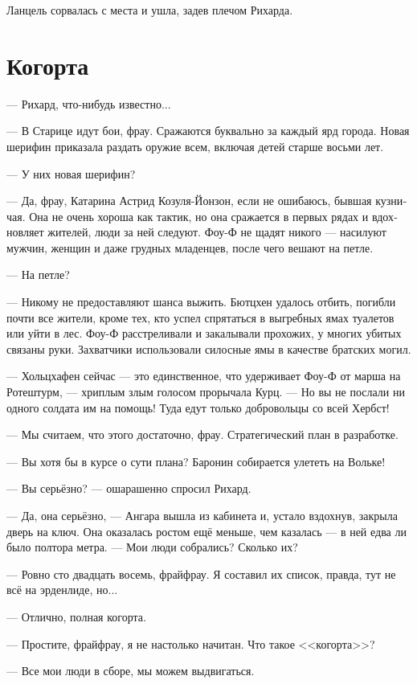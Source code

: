 \documentclass[a4paper,12pt,fleqn]{book}\usepackage{cooltooltips}\usepackage{polyglossia}\setdefaultlanguage[babelshorthands=true]{russian}\setotherlanguage{english}\defaultfontfeatures{Ligatures=TeX,Mapping=tex-text} \usepackage{xcolor}\definecolor{lightgray}{HTML}{bbbbbb}\color{lightgray}\newcommand{\ml}[3]{\textenglish{\textcolor{black}{#3}}}
\begin{document}
Ланцель сорвалась с места и ушла, задев плечом Рихарда.

\section{Когорта}

--- Рихард, что-нибудь известно...

--- В Старице идут бои, фрау.
Сражаются буквально за каждый ярд города.
Новая шерифин приказала раздать оружие всем, включая детей старше восьми лет.

--- У них новая шерифин?

--- Да, фрау, Катарина Астрид Козуля-Йонзон, если не ошибаюсь, бывшая кузничая.
Она не очень хороша как тактик, но она сражается в первых рядах и вдохновляет жителей, люди за ней следуют.
Фоу-Ф не щадят никого --- насилуют мужчин, женщин и даже грудных младенцев, после чего вешают на петле.

--- На петле?

--- Никому не предоставляют шанса выжить.
Бютцхен удалось отбить, погибли почти все жители, кроме тех, кто успел спрятаться в выгребных ямах туалетов или уйти в лес. %
Фоу-Ф расстреливали и закалывали прохожих, у многих убитых связаны руки.
Захватчики использовали силосные ямы в качестве братских могил.

--- Хольцхафен сейчас --- это единственное, что удерживает Фоу-Ф от марша на Ротештурм, --- хриплым злым голосом прорычала Курц.
--- Но вы не послали ни одного солдата им на помощь!
Туда едут только добровольцы со всей Хербст!

--- Мы считаем, что этого достаточно, фрау.
Стратегический план в разработке.

--- Вы хотя бы в курсе о сути плана?
Баронин собирается улететь на Вольке!

--- Вы серьёзно? --- ошарашенно спросил Рихард.

--- Да, она серьёзно, --- Ангара вышла из кабинета и, устало вздохнув, закрыла дверь на ключ.
Она оказалась ростом ещё меньше, чем казалась --- в ней едва ли было полтора метра.
--- Мои люди собрались?
Сколько их?

--- Ровно сто двадцать восемь, фрайфрау.
Я составил их список, правда, тут не всё на эрденлиде, но...

--- Отлично, полная когорта.

--- Простите, фрайфрау, я не настолько начитан.
Что такое <<когорта>>?

--- Все мои люди в сборе, мы можем выдвигаться.
\end{document}
